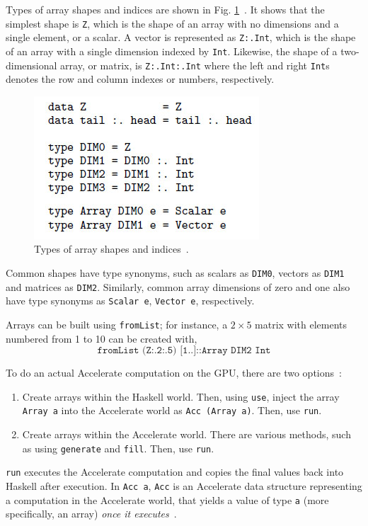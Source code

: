Types of array shapes and indices are shown in Fig. \ref{fig:acc-types}~\cite{ChaKelLee11}. It shows that the simplest shape is \texttt{Z}, which is the shape of an array with no dimensions and a single element, or a scalar. A vector is represented as \texttt{Z:.Int}, which is the shape of an array with a single dimension indexed by \texttt{Int}. Likewise, the shape of a two-dimensional array, or matrix, is \texttt{Z:.Int:.Int} where the left and right \texttt{Int}s denotes the row and column indexes or numbers, respectively.

\begin{figure}
  \centerline{\includegraphics[width=0.5\linewidth]{accelerate-types.jpg}}
  \caption{Types of array shapes and indices~\cite{ChaKelLee11}.}
  \label{fig:acc-types}
\end{figure}

Common shapes have type synonyms, such as scalars as \texttt{DIM0}, vectors as \texttt{DIM1} and matrices as \texttt{DIM2}. Similarly, common array dimensions of zero and one also have type synonyms as \texttt{Scalar e}, \texttt{Vector e}, respectively.

Arrays can be built using \texttt{fromList}; for instance, a $2 \times 5$ matrix with elements numbered from 1 to 10 can be created with,
$$\texttt{fromList (Z:.2:.5) [1..]::Array DIM2 Int}$$

To do an actual Accelerate computation on the GPU, there are two options~\cite{Mar13}:
\begin{enumerate}
\item Create arrays within the Haskell world. Then, using \texttt{use}, inject the array \texttt{Array a} into the Accelerate world as \texttt{Acc (Array a)}. Then, use \texttt{run}.
\item Create arrays within the Accelerate world. There are various methods, such as using \texttt{generate} and \texttt{fill}. Then, use \texttt{run}.
\end{enumerate}
\texttt{run} executes the Accelerate computation and copies the final values back into Haskell after execution. In \texttt{Acc a}, \texttt{Acc} is an Accelerate data structure representing a computation in the Accelerate world, that yields a value of type \texttt{a} (more specifically, an array) \textit{once it executes}~\cite{McD13, Mar13}. 

